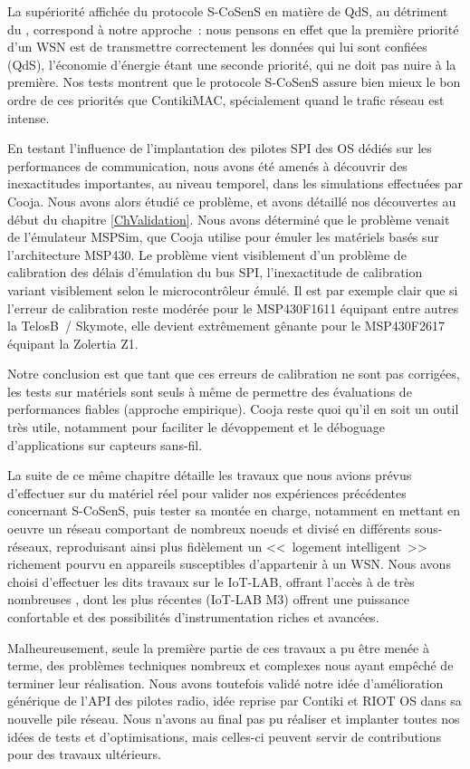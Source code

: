 La supériorité affichée du protocole S-CoSenS en matière de QdS, au
détriment du , correspond à notre approche~: nous
pensons en effet que la première priorité d'un WSN est de transmettre
correctement les données qui lui sont confiées (QdS), l'économie d'énergie
étant une seconde priorité, qui ne doit pas nuire à la première.
Nos tests montrent que le protocole S-CoSenS assure bien mieux le bon
ordre de ces priorités que ContikiMAC, spécialement quand le trafic
réseau est intense.

En testant l'influence de l'implantation des pilotes SPI des OS dédiés
sur les performances de communication, nous avons été amenés à découvrir
des inexactitudes importantes, au niveau temporel, dans les simulations
effectuées par Cooja. Nous avons alors étudié ce problème, et avons
détaillé nos découvertes au début du chapitre \ref{ChValidation}.
Nous avons déterminé que le problème venait de l'émulateur MSPSim,
que Cooja utilise pour émuler les matériels basés sur l'architecture
MSP430. Le problème vient visiblement d'un problème de calibration des
délais d'émulation du bus SPI, l'inexactitude de calibration variant
visiblement selon le microcontrôleur émulé. Il est par exemple clair
que si l'erreur de calibration reste modérée pour le MSP430F1611
équipant entre autres la TelosB~/ Skymote, elle devient extrêmement
gênante pour le MSP430F2617 équipant la Zolertia Z1.

Notre conclusion est que tant que ces erreurs de calibration ne sont
pas corrigées, les tests sur matériels sont seuls à même de permettre
des évaluations de performances fiables (approche empirique). Cooja
reste quoi qu'il en soit un outil très utile, notamment pour faciliter
le dévoppement et le déboguage d'applications sur capteurs sans-fil.

La suite de ce même chapitre détaille les travaux que nous avions prévus
d'effectuer sur du matériel réel pour valider nos expériences précédentes
concernant S-CoSenS, puis tester sa montée en charge, notamment en mettant
en oeuvre un réseau comportant de nombreux noeuds et divisé en différents
sous-réseaux, reproduisant ainsi plus fidèlement un <<~logement
intelligent~>> richement pourvu en appareils susceptibles d'appartenir
à un WSN. Nous avons choisi d'effectuer les dits travaux sur le
 IoT-LAB, offrant l'accès à de très nombreuses ,
dont les plus récentes (IoT-LAB M3) offrent une puissance confortable
et des possibilités d'instrumentation riches et avancées.

Malheureusement, seule la première partie de ces travaux a pu être menée
à terme, des problèmes techniques nombreux et complexes nous ayant empêché
de terminer leur réalisation. Nous avons toutefois validé notre idée
d'amélioration générique de l'API des pilotes radio, idée reprise par
Contiki et RIOT OS dans sa nouvelle pile réseau. Nous n'avons au final
pas pu réaliser et implanter toutes nos idées de tests et d'optimisations,
mais celles-ci peuvent servir de contributions pour des travaux
ultérieurs.

